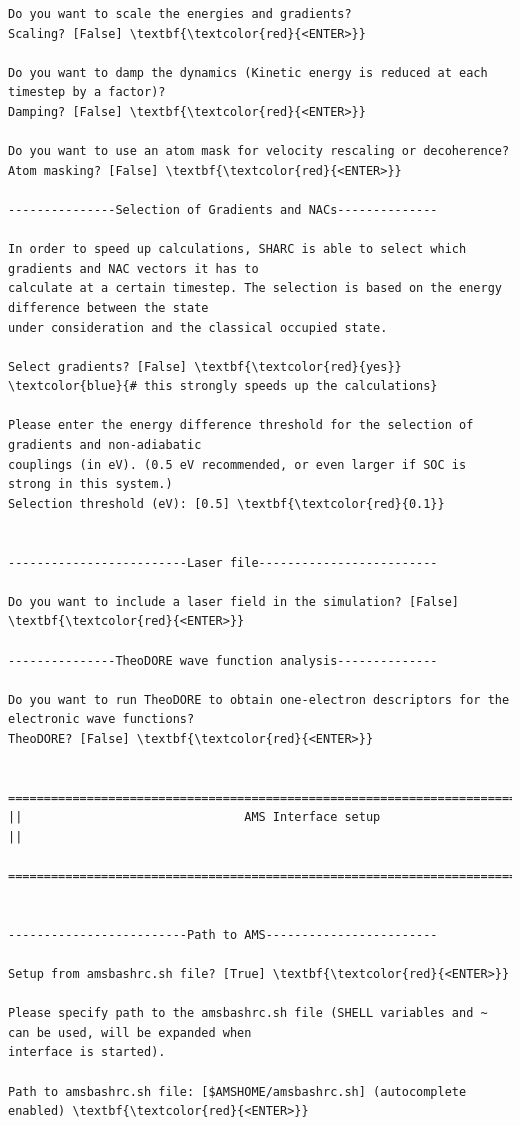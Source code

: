 \documentclass[a4paper,11pt,DIV=15,openany]{scrbook}
\begin{document}
\begin{oframed}
\begin{Verbatim}[commandchars=\\\{\}]
Do you want to scale the energies and gradients?
Scaling? [False] \textbf{\textcolor{red}{<ENTER>}}

Do you want to damp the dynamics (Kinetic energy is reduced at each timestep by a factor)?
Damping? [False] \textbf{\textcolor{red}{<ENTER>}}

Do you want to use an atom mask for velocity rescaling or decoherence?
Atom masking? [False] \textbf{\textcolor{red}{<ENTER>}}

---------------Selection of Gradients and NACs--------------

In order to speed up calculations, SHARC is able to select which gradients and NAC vectors it has to 
calculate at a certain timestep. The selection is based on the energy difference between the state 
under consideration and the classical occupied state.

Select gradients? [False] \textbf{\textcolor{red}{yes}}    \textcolor{blue}{# this strongly speeds up the calculations}

Please enter the energy difference threshold for the selection of gradients and non-adiabatic 
couplings (in eV). (0.5 eV recommended, or even larger if SOC is strong in this system.)
Selection threshold (eV): [0.5] \textbf{\textcolor{red}{0.1}}


-------------------------Laser file-------------------------

Do you want to include a laser field in the simulation? [False] \textbf{\textcolor{red}{<ENTER>}}

---------------TheoDORE wave function analysis--------------

Do you want to run TheoDORE to obtain one-electron descriptors for the electronic wave functions?
TheoDORE? [False] \textbf{\textcolor{red}{<ENTER>}} 

  ================================================================================
||                               AMS Interface setup                              ||
  ================================================================================


-------------------------Path to AMS------------------------

Setup from amsbashrc.sh file? [True] \textbf{\textcolor{red}{<ENTER>}}

Please specify path to the amsbashrc.sh file (SHELL variables and ~ can be used, will be expanded when 
interface is started).

Path to amsbashrc.sh file: [$AMSHOME/amsbashrc.sh] (autocomplete enabled) \textbf{\textcolor{red}{<ENTER>}}


\end{Verbatim}
\end{oframed}
\end{document}
